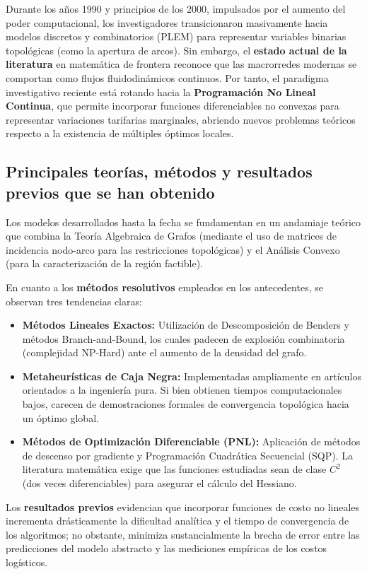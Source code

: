 Durante los años 1990 y principios de los 2000, impulsados por el aumento del poder computacional, los investigadores transicionaron masivamente hacia modelos discretos y combinatorios (PLEM) para representar variables binarias topológicas (como la apertura de arcos). Sin embargo, el \textbf{estado actual de la literatura} en matemática de frontera reconoce que las macrorredes modernas se comportan como flujos fluidodinámicos continuos. Por tanto, el paradigma investigativo reciente está rotando hacia la \textbf{Programación No Lineal Continua}, que permite incorporar funciones diferenciables no convexas para representar variaciones tarifarias marginales, abriendo nuevos problemas teóricos respecto a la existencia de múltiples óptimos locales.

\subsection{Principales teorías, métodos y resultados previos que se han obtenido}
Los modelos desarrollados hasta la fecha se fundamentan en un andamiaje teórico que combina la Teoría Algebraica de Grafos (mediante el uso de matrices de incidencia nodo-arco para las restricciones topológicas) y el Análisis Convexo (para la caracterización de la región factible).

En cuanto a los \textbf{métodos resolutivos} empleados en los antecedentes, se observan tres tendencias claras:
\begin{itemize}
    \item \textbf{Métodos Lineales Exactos:} Utilización de Descomposición de Benders y métodos Branch-and-Bound, los cuales padecen de explosión combinatoria (complejidad NP-Hard) ante el aumento de la densidad del grafo.
    \item \textbf{Metaheurísticas de Caja Negra:} Implementadas ampliamente en artículos orientados a la ingeniería pura. Si bien obtienen tiempos computacionales bajos, carecen de demostraciones formales de convergencia topológica hacia un óptimo global.
    \item \textbf{Métodos de Optimización Diferenciable (PNL):} Aplicación de métodos de descenso por gradiente y Programación Cuadrática Secuencial (SQP). La literatura matemática exige que las funciones estudiadas sean de clase $C^2$ (dos veces diferenciables) para asegurar el cálculo del Hessiano.
\end{itemize}

Los \textbf{resultados previos} evidencian que incorporar funciones de costo no lineales incrementa drásticamente la dificultad analítica y el tiempo de convergencia de los algoritmos; no obstante, minimiza sustancialmente la brecha de error entre las predicciones del modelo abstracto y las mediciones empíricas de los costos logísticos.
